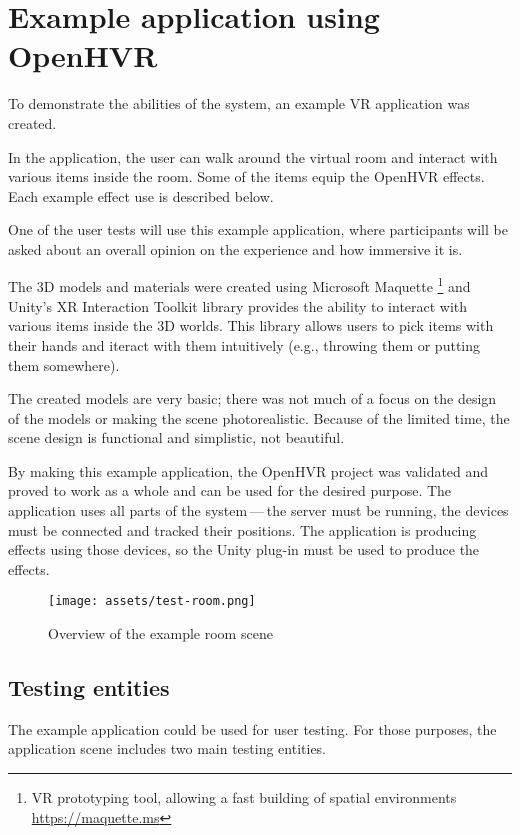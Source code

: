 \chapter{Example application using OpenHVR}

To demonstrate the abilities of the system, an example VR application
was created.


In the application, the user can walk around the virtual room and interact with
various items inside the room. Some of the items equip the OpenHVR
effects. Each example effect use is described below.


One of the user tests will use this example application, where
participants will be asked about an overall opinion on the experience and
how immersive it is.


The 3D models and materials were created using Microsoft Maquette
\footnote{VR prototyping tool, allowing a fast building of spatial environments \href{https://maquette.ms}{https://maquette.ms}}
and Unity’s XR Interaction Toolkit library provides the ability to
interact with various items inside the 3D worlds. This library allows users to
pick items with their hands and iteract with them intuitively (e.g., throwing them
or putting them somewhere).


The created models are very basic; there was not much of a focus on the design
of the models or making the scene photorealistic. Because of the limited time,
the scene design is functional and simplistic, not beautiful.


By making this example application, the OpenHVR project was validated and proved
to work as a whole and can be used for the desired purpose. The application uses
all parts of the system — the server must be running, the devices must be
connected and tracked their positions. The application is producing effects
using those devices, so the Unity plug-in must be used to produce the effects.


\begin{figure}[h]{}
\centering\texttt{[image: assets/test-room.png]}
\caption{Overview of the example room scene}

\end{figure}

\hypertarget{x-testing-entities}{\section{Testing entities}}
The example application could be used for user testing. For those purposes,
the application scene includes two main testing entities.


